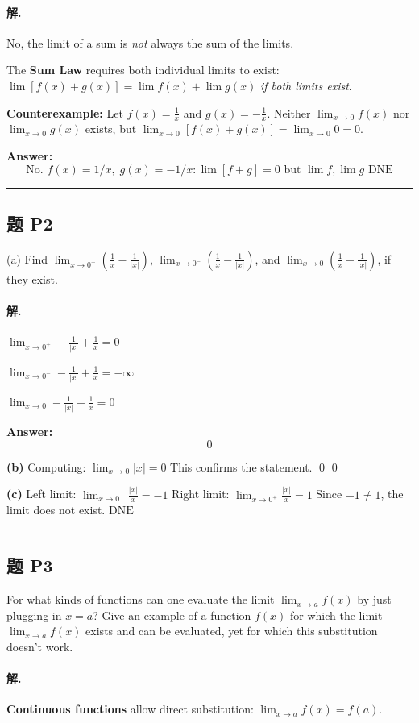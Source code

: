 \documentclass[12pt, a4paper]{article}
\newcommand{\problem}[1]{\subsection*{题 #1}}
\newcommand{\solution}{\paragraph{解.}}
\begin{document}
\solution

No, the limit of a sum is \emph{not} always the sum of the limits.

The \textbf{Sum Law} requires both individual limits to exist: $\lim[f(x)+g(x)] = \lim f(x) + \lim g(x)$ \emph{if both limits exist}.

\textbf{Counterexample:} Let $f(x) = \frac{1}{x}$ and $g(x) = -\frac{1}{x}$. Neither $\lim_{x \to 0} f(x)$ nor $\lim_{x \to 0} g(x)$ exists, but $\lim_{x \to 0}[f(x)+g(x)] = \lim_{x \to 0} 0 = 0$.

\textbf{Answer:}
\[\boxed{\text{No. } f(x)=1/x,\; g(x)=-1/x: \lim[f+g]=0 \text{ but } \lim f, \lim g \text{ DNE}}\]

\vspace{1em}
\hrule
\vspace{1em}

\problem{P2}

(a) Find $\lim_{x \to 0^+}(\frac{1}{x} - \frac{1}{|x|})$, $\lim_{x \to 0^-}(\frac{1}{x} - \frac{1}{|x|})$, and $\lim_{x \to 0}(\frac{1}{x} - \frac{1}{|x|})$, if they exist.

\solution

$\lim_{x \to 0^+} - \frac{1}{\left|{x}\right|} + \frac{1}{x} = 0$

$\lim_{x \to 0^-} - \frac{1}{\left|{x}\right|} + \frac{1}{x} = -\infty$

$\lim_{x \to 0} - \frac{1}{\left|{x}\right|} + \frac{1}{x} = 0$

\textbf{Answer:}
\[\boxed{0}\]

\textbf{(b)}
Computing: $\lim_{x \to 0} \left|{x}\right| = 0$
This confirms the statement. \qed
$\boxed{0}$

\textbf{(c)}
Left limit: $\lim_{x \to 0^-} \frac{\left|{x}\right|}{x} = -1$
Right limit: $\lim_{x \to 0^+} \frac{\left|{x}\right|}{x} = 1$
Since $-1 \neq 1$, the limit does not exist.
$\boxed{\text{DNE}}$

\vspace{1em}
\hrule
\vspace{1em}

\problem{P3}

For what kinds of functions can one evaluate the limit $\lim_{x \to a} f(x)$ by just plugging in $x = a$? Give an example of a function $f(x)$ for which the limit $\lim_{x \to a} f(x)$ exists and can be evaluated, yet for which this substitution doesn't work.

\solution

\textbf{Continuous functions} allow direct substitution: $\lim_{x \to a} f(x) = f(a)$.
\end{document}
